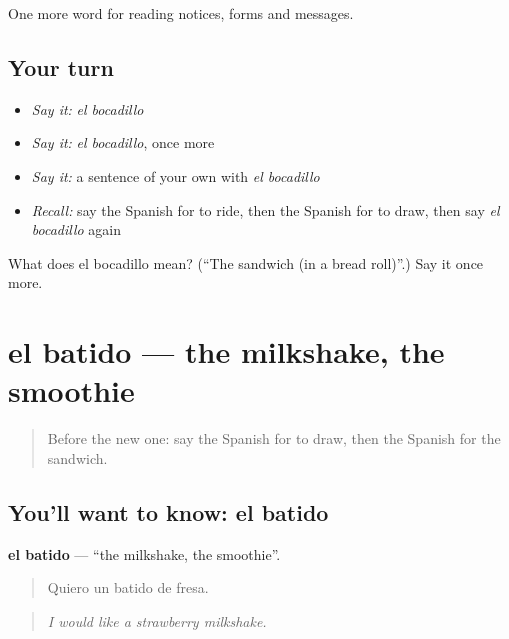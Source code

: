 \begin{grammarlens}[title={What you've built}]
One more word for reading notices, forms and messages.
\end{grammarlens}

\subsection*{Your turn}
\begin{itemize}
\raggedright
  \item \emph{Say it:} \emph{el bocadillo}
  \item \emph{Say it:} \emph{el bocadillo}, once more
  \item \emph{Say it:} a sentence of your own with \emph{el bocadillo}
  \item \emph{Recall:} say the Spanish for to ride, then the Spanish for to draw, then say \emph{el bocadillo} again
\end{itemize}

\begin{tcolorbox}[breakable,colback=teal!4,colframe=teal!35!black,title={Before you move on}]
What does el bocadillo mean? (\textquotedblleft{}The sandwich (in a bread roll)\textquotedblright{}.) Say it once more.
\end{tcolorbox}
\section[el batido]{el batido — the milkshake, the smoothie}

\label{lesson:ES-C499-batido}



\begin{quote}
Before the new one: say the Spanish for to draw, then the Spanish for the sandwich.
\end{quote}

\subsection*{You'll want to know: el batido}
\textbf{el batido} — \textquotedblleft{}the milkshake, the smoothie\textquotedblright{}.

\begin{quote}
Quiero un batido de fresa.
\end{quote}

\begin{quote}
\emph{I would like a strawberry milkshake.}
\end{quote}

